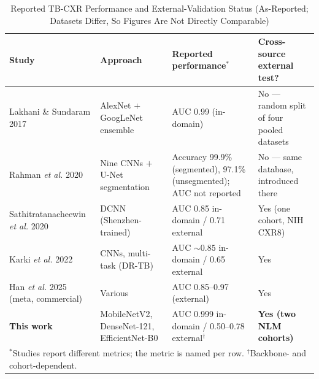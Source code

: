 \documentclass[journal]{IEEEtran}
\begin{document}
\begin{table}[!t]
\caption{Reported TB-CXR Performance and External-Validation Status
(As-Reported; Datasets Differ, So Figures Are Not Directly Comparable)}
\label{tab:priorwork}
\centering
\footnotesize
\begin{tabular}{p{3.4cm}p{4.2cm}p{4.8cm}p{3.6cm}}
\toprule
Study & Approach & Reported performance$^{*}$ & Cross-source external test? \\
\midrule
Lakhani \& Sundaram 2017~\cite{lakhani2017deep} & AlexNet $+$ GoogLeNet ensemble &
AUC 0.99 (in-domain) & No --- random split of four pooled datasets \\
Rahman \emph{et al.} 2020~\cite{rahman2020reliable} &
Nine CNNs $+$ U-Net segmentation & Accuracy 99.9\% (segmented), 97.1\% (unsegmented);
AUC not reported & No --- same database, introduced there \\
Sathitratanacheewin \emph{et al.} 2020~\cite{sathitratanacheewin2020deep} &
DCNN (Shenzhen-trained) & AUC 0.85 in-domain / 0.71 external &
Yes (one cohort, NIH CXR8) \\
Karki \emph{et al.} 2022~\cite{karki2022generalization} &
CNNs, multi-task (DR-TB) & AUC ${\sim}0.85$ in-domain / 0.65 external & Yes \\
Han \emph{et al.} 2025~\cite{han2025systematic} (meta, commercial) & Various &
AUC 0.85--0.97 (external) & Yes \\
\textbf{This work} & MobileNetV2, DenseNet-121, EfficientNet-B0 &
AUC 0.999 in-domain / 0.50--0.78 external$^{\dagger}$ &
\textbf{Yes (two NLM cohorts)} \\
\bottomrule
\multicolumn{4}{l}{\footnotesize $^{*}$Studies report different metrics; the metric is named per
row. $^{\dagger}$Backbone- and cohort-dependent.}
\end{tabular}
\end{table}
\end{document}
